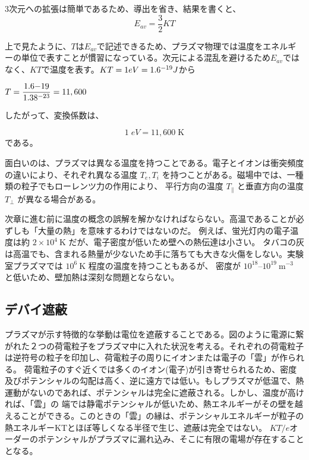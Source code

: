 \documentclass{ltjsarticle}
\numberwithin{equation}{section} %
\begin{document}
3次元への拡張は簡単であるため、導出を省き、結果を書くと、
\begin{equation}
  E_{av} = \frac{3}{2}KT
\end{equation}

上で見たように、$T$は$E_{av}$で記述できるため、プラズマ物理では温度をエネルギーの単位で表すことが慣習になっている。次元による混乱を避けるため$E_{av}$ではなく、$KT$で温度を表す。$KT = 1\space eV = 1.6 \time 10^{-19}\space J $から

\begin{center}
  $T= \dfrac{1.6\time 10{-19}}{1.38\time 10^{-23}} = {11,600}$
\end{center}
したがって、変換係数は、

\begin{equation}
  1\;\unit{eV}= {11,600}\; \unit{\kelvin}
\end{equation}
である。

面白いのは、プラズマは異なる温度を持つことである。電子とイオンは衝突頻度の違いにより、それぞれ異なる温度
  \( T_e, T_i \) を持つことがある。磁場中では、一種類の粒子でもローレンツ力の作用により、
  平行方向の温度 \( T_{\parallel} \) と垂直方向の温度 \( T_{\perp} \) が異なる場合がある。

次章に進む前に温度の概念の誤解を解かなければならない。高温であることが必ずしも「大量の熱」を意味するわけではないのだ。
例えば、蛍光灯内の電子温度は約 $2\times 10^4 \ \mathrm{K}$ だが、電子密度が低いため壁への熱伝達は小さい。
タバコの灰は高温でも、含まれる熱量が少ないため手に落ちても大きな火傷をしない。実験室プラズマでは $10^6 \ \mathrm{K}$ 程度の温度を持つこともあるが、
密度が $10^{18}$--$10^{19} \ \mathrm{m^{-3}}$ と低いため、壁加熱は深刻な問題とならない。


\subsection{デバイ遮蔽} \label{section1.4}
プラズマが示す特徴的な挙動は電位を遮蔽することである。図のように電源に繋がれた２つの荷電粒子をプラズマ中に入れた状況を考える。それぞれの荷電粒子は逆符号の粒子を印加し、荷電粒子の周りにイオンまたは電子の「雲」が作られる。
荷電粒子のすぐ近くでは多くのイオン(電子)が引き寄せられるため、密度及びポテンシャルの勾配は高く、逆に遠方では低い。もしプラズマが低温で、熱運動がないのであれば、ポテンシャルは完全に遮蔽される。しかし、温度が高ければ、「雲」の
端では静電ポテンシャルが低いため、熱エネルギーがその壁を越えることができる。このときの「雲」の縁は、ポテンシャルエネルギーが粒子の熱エネルギーKTとほぼ等しくなる半径で生じ、遮蔽は完全ではない。
$KT/e$オーダーのポテンシャルがプラズマに漏れ込み、そこに有限の電場が存在することとなる。
\end{document}
